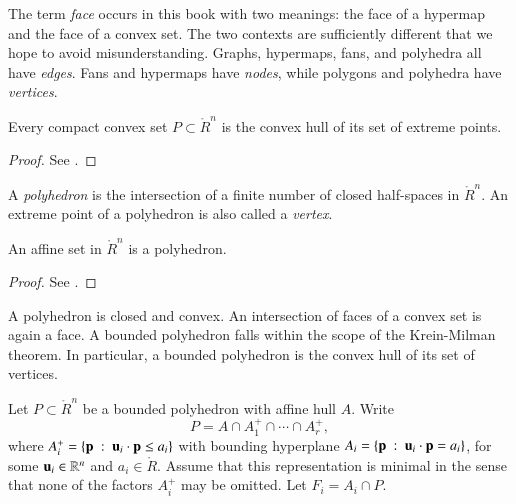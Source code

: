 \begin{remark}\label{remark:face} 
The term {\it face} occurs in this book with two meanings: the face of a hypermap and the face of a convex set.  The two contexts are sufficiently different that we hope to avoid misunderstanding.  Graphs, hypermaps, fans, and polyhedra all have {\it edges}.  Fans and hypermaps have {\it nodes}, while polygons and polyhedra have {\it vertices}.
\end{remark}

\begin{lemma} Every compact convex set $P\subset\ring{R}^n$ is the convex hull of its set of extreme points.
\end{lemma}

\begin{proof}  See \cite[Theorem~2.6.16]{webster:1994}.
\end{proof}


\begin{definition}  A {\it polyhedron} is the intersection of
a finite number of closed half-spaces in $\ring{R}^n$.  An extreme point of a polyhedron is also called a {\it vertex}.
\end{definition}
%

\begin{lemma}\label{lemma:aff-poly}
An affine set in $\ring{R}^n$ is a polyhedron.
\end{lemma}

\begin{proof} See \cite[Cor~1.4.2]{webster:1994}.
\end{proof}

A polyhedron is closed and convex.  An intersection of faces of a convex set is again a face.  A bounded polyhedron falls within the scope of the Krein-Milman theorem.  In particular, a bounded polyhedron is the convex hull of its set of vertices.
%

Let $P\subset\ring{R}^n$ be a bounded polyhedron with affine hull $A$. Write 
$$
P = A \cap A^+_1 \cap \cdots \cap A^+_r,
$$
where
$A^+_i = \{{\mathbf p}\ :\  {\mathbf u}_i\cdot {\mathbf p} \le a_i\}$ with bounding hyperplane
$A_i=\{{\mathbf p}\ :\  {\mathbf u}_i \cdot {\mathbf p} = a_i\}$, for some ${\mathbf u}_i\in \mathbb{R}^n$ and $a_i\in\ring{R}$. 
Assume that this representation is minimal in the sense that none of the factors $A^+_i$ may be omitted.  Let $F_i = A_i\cap P$.
%


